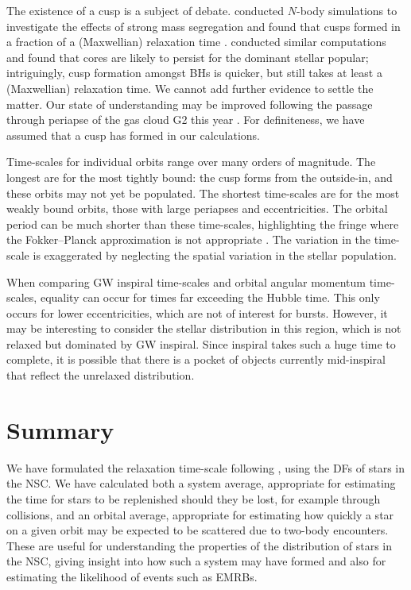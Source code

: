 The existence of a cusp is a subject of debate. \citet{Preto2010} conducted $N$-body simulations to investigate the effects of strong mass segregation \citep{Alexander2009, Keshet2009} and found that cusps formed in a fraction of a (Maxwellian) relaxation time \citep{Amaro-Seoane2011d}. \citet{Gualandris2012} conducted similar computations and found that cores are likely to persist for the dominant stellar popular; intriguingly, cusp formation amongst BHs is quicker, but still takes at least a (Maxwellian) relaxation time. We cannot add further evidence to settle the matter. Our state of understanding may be improved following the passage through periapse of the gas cloud G2 this year \citep{Bartos2013}. For definiteness, we have assumed that a cusp has formed in our calculations.

Time-scales for individual orbits range over many orders of magnitude. The longest are for the most tightly bound: the cusp forms from the outside-in, and these orbits may not yet be populated. The shortest time-scales are for the most weakly bound orbits, those with large periapses and eccentricities. The orbital period can be much shorter than these time-scales, highlighting the fringe where the Fokker--Planck approximation is not appropriate \citep{Spitzer1972Jr}. The variation in the time-scale is exaggerated by neglecting the spatial variation in the stellar population.

When comparing GW inspiral time-scales and orbital angular momentum time-scales, equality can occur for times far exceeding the Hubble time. This only occurs for lower eccentricities, which are not of interest for bursts. However, it may be interesting to consider the stellar distribution in this region, which is not relaxed but dominated by GW inspiral. Since inspiral takes such a huge time to complete, it is possible that there is a pocket of objects currently mid-inspiral that reflect the unrelaxed distribution.

\section{Summary}

We have formulated the relaxation time-scale following \citet{Chandrasekhar1960}, using the DFs of stars in the NSC. We have calculated both a system average, appropriate for estimating the time for stars to be replenished should they be lost, for example through collisions, and an orbital average, appropriate for estimating how quickly a star on a given orbit may be expected to be scattered due to two-body encounters. These are useful for understanding the properties of the distribution of stars in the NSC, giving insight into how such a system may have formed and also for estimating the likelihood of events such as EMRBs.

